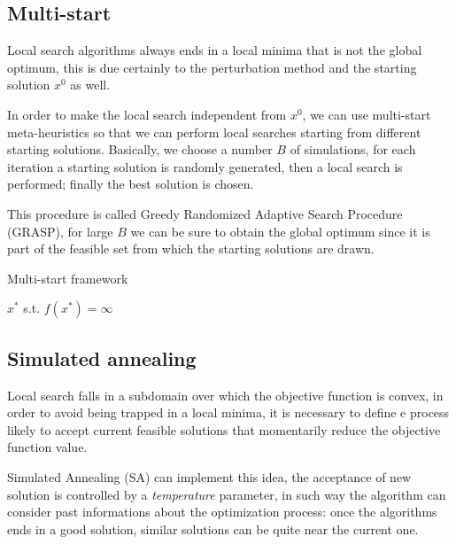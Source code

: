 \subsection{Multi-start}\label{subsc:multi-start}

Local search algorithms always ends in a local minima that is not the global optimum, this is due certainly to the perturbation method and the starting solution $x^0$ as well.

In order to make the local search independent from $x^0$, we can use multi-start meta-heuristics so that we can perform local searches starting from different starting solutions. Basically, we choose a number $B$ of simulations, for each iteration a starting solution is randomly generated, then a local search is performed; finally the best solution is chosen.

This procedure is called Greedy Randomized Adaptive Search Procedure (GRASP), for large $B$ we can be sure to obtain the global optimum since it is part of the feasible set from which the starting solutions are drawn.

\begin{algorithm}\caption{Multi-start framework}\label{alg:multi-start}
	$x^\ast$ s.t. $f(x^\ast)=\infty$\;
\end{algorithm}


\subsection{Simulated annealing}

Local search falls in a subdomain over which the objective function is convex, in order to avoid being trapped in a local minima, it is necessary to define e process likely to accept current feasible solutions that momentarily reduce the objective function value.

Simulated Annealing (SA) can implement this idea, the acceptance of new solution is controlled by a \emph{temperature} parameter, in such way the algorithm can consider past informations about the optimization process: once the algorithms ends in a good solution, similar solutions can be quite near the current one.

